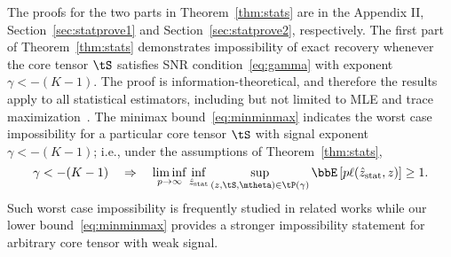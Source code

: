 \documentclass[lettersize,onecolumn,journal]{IEEEtran}
\theoremstyle{definition}
\theoremstyle{definition}
\begin{document}
{
\color{blue} 
The proofs for the two parts in Theorem~\ref{thm:stats} are in the Appendix II, Section~\ref{sec:statprove1} and Section~\ref{sec:statprove2}, respectively. The first part of Theorem~\ref{thm:stats} demonstrates impossibility of exact recovery whenever the core tensor $\tS$ satisfies SNR condition~\eqref{eq:gamma} with exponent $\gamma < -(K-1)$. The proof is information-theoretical, and therefore the results apply to all statistical estimators, including but not limited to MLE and trace maximization~\citep{ghoshdastidar2017uniform}. The minimax bound~\eqref{eq:minminmax} indicates the worst case impossibility for a particular core tensor $\tS$ with signal exponent $\gamma < -(K-1)$; i.e., under the assumptions of Theorem~\ref{thm:stats}, 
\begin{equation}
    \gamma < -(K-1) \quad \Rightarrow \quad \liminf_{p \rightarrow \infty}  \inf_{\hat z_{\text{stat}}}\sup_{ (z,\tS, \mtheta) \in \tP(\gamma)} \bbE \left[ p\ell(\hat z_{\text{stat}}, z) \right]\geq 1.
\end{equation}
Such worst case impossibility is frequently studied in related works \citep{han2020exact, gao2018community} while our lower bound~\eqref{eq:minminmax} provides a stronger impossibility statement for arbitrary core tensor with weak signal. 



}

\end{document}
